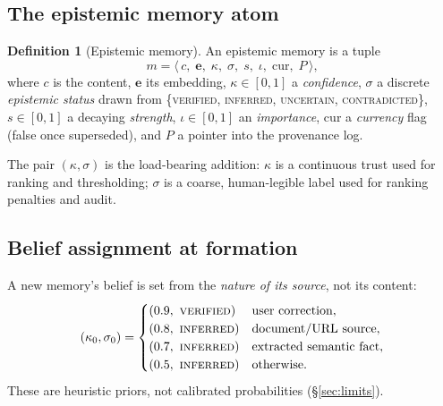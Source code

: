 \documentclass[11pt]{article}
\theoremstyle{definition}
\newtheorem{definition}{Definition}
\newcommand{\status}[1]{\textsc{#1}}
\begin{document}
\subsection{The epistemic memory atom}
\begin{definition}[Epistemic memory]
An epistemic memory is a tuple
\[
m = \langle\, c,\; \mathbf{e},\; \kappa,\; \sigma,\; s,\; \iota,\; \mathrm{cur},\; P \,\rangle,
\]
where $c$ is the content, $\mathbf{e}$ its embedding, $\kappa\in[0,1]$ a
\emph{confidence}, $\sigma$ a discrete \emph{epistemic status} drawn from
\{\status{verified}, \status{inferred}, \status{uncertain},
\status{contradicted}\}, $s\in[0,1]$ a decaying \emph{strength}, $\iota\in[0,1]$
an \emph{importance}, $\mathrm{cur}$ a \emph{currency} flag (false once
superseded), and $P$ a pointer into the provenance log.
\end{definition}
The pair $(\kappa,\sigma)$ is the load-bearing addition: $\kappa$ is a continuous
trust used for ranking and thresholding; $\sigma$ is a coarse, human-legible
label used for ranking penalties and audit.

\subsection{Belief assignment at formation}
A new memory's belief is set from the \emph{nature of its source}, not its
content:
\begin{equation}
(\kappa_0,\sigma_0)=
\begin{cases}
(0.9,\ \status{verified}) & \text{user correction},\\
(0.8,\ \status{inferred}) & \text{document/URL source},\\
(0.7,\ \status{inferred}) & \text{extracted semantic fact},\\
(0.5,\ \status{inferred}) & \text{otherwise.}
\end{cases}
\label{eq:formation}
\end{equation}
These are heuristic priors, not calibrated probabilities (\S\ref{sec:limits}).
\end{document}
